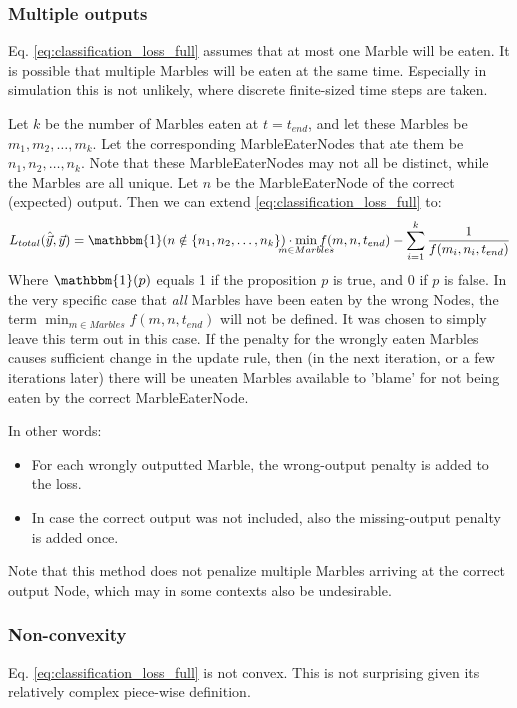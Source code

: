 \subsubsection{Multiple outputs}
Eq. \eqref{eq:classification_loss_full} assumes that at most one Marble will be eaten. 
It is possible that multiple Marbles will be eaten at the same time. 
Especially in simulation this is not unlikely, where discrete finite-sized time steps are taken.

Let $k$ be the number of Marbles eaten at $t = t_{end}$, and let these Marbles be $m_1, m_2, \dots, m_k$. 
Let the corresponding MarbleEaterNodes that ate them be $n_1, n_2, \dots, n_k$. 
Note that these MarbleEaterNodes may not all be distinct, while the Marbles are all unique. 
Let $n$ be the MarbleEaterNode of the correct (expected) output. 
Then we can extend \eqref{eq:classification_loss_full} to:
\begin{equation}
	L_{total}(\hat{\vec{y}}, \vec{y}) = \mathbbm{1}(n\notin \{n_1, n_2, \dots, n_k\}) \cdot \smashoperator{\min_{m \in Marbles}} f(m, n, t_{end}) 
									  - \sum_{i=1}^{k}   \frac{1}{f(m_i, n_i, t_{end})}
\end{equation}
Where $\mathbbm{1}(p)$ equals 1 if the proposition $p$ is true, and 0 if $p$ is false.
In the very specific case that \textit{all} Marbles have been eaten by the wrong Nodes,
the term $\min_{m \in Marbles} f(m, n, t_{end})$ will not be defined. 
It was chosen to simply leave this term out in this case. 
If the penalty for the wrongly eaten Marbles causes sufficient change in the update rule, 
then (in the next iteration, or a few iterations later) 
there will be uneaten Marbles available to 'blame' for not being eaten by the correct MarbleEaterNode.

In other words:
\begin{itemize}
	\item For each wrongly outputted Marble, the wrong-output penalty is added to the loss.
	\item In case the correct output was not included, also the missing-output penalty is added once.
\end{itemize}

Note that this method does not penalize multiple Marbles arriving at the correct output Node, 
which may in some contexts also be undesirable.

\subsubsection{Non-convexity}
Eq. \eqref{eq:classification_loss_full} is not convex. This is not surprising given its relatively complex piece-wise definition. 
%

